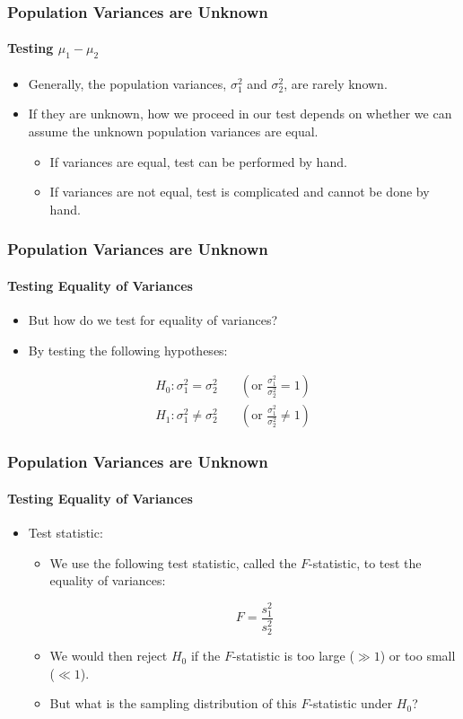 \documentclass[12pt]{beamer}
\begin{document}
\begin{frame}
	\frametitle{Population Variances are Unknown}
	\framesubtitle{Testing $\mu_1 - \mu_2$}
	
	\begin{itemize}[label={\color{blue}$\blacktriangleright$}]
		\item Generally, the population variances, $\sigma_1^2$ and $\sigma_2^2$, are rarely known.
		\item If they are unknown, how we proceed in our test depends on whether we can assume the unknown population variances are equal.
		\begin{itemize}[label={\color{blue}$\blacktriangleright$}]
			\item If variances are equal, test can be performed by hand.
			\item If variances are not equal, test is complicated and cannot be done by hand.
		\end{itemize}
	\end{itemize}
	
\end{frame}
\begin{frame}
	\frametitle{Population Variances are Unknown}
	\framesubtitle{Testing Equality of Variances}
	
	\begin{itemize}[label={\color{blue}$\blacktriangleright$}]
		\item But how do we test for equality of variances?
		\item By testing the following hypotheses:
	\end{itemize}
	

	\begin{align*}
		H_0 : \sigma_1^2 = \sigma_2^2 \quad &\left(\text{or } \frac{\sigma_1^2}{\sigma_2^2} = 1\right) \\[0.5cm]
		H_1 : \sigma_1^2 \neq \sigma_2^2 \quad &\left(\text{or } \frac{\sigma_1^2}{\sigma_2^2} \neq 1\right)
	\end{align*}
	
\end{frame}
\begin{frame}
	\frametitle{Population Variances are Unknown}
	\framesubtitle{Testing Equality of Variances}
	
	\begin{itemize}[label={\color{blue}$\blacktriangleright$}]
		\item Test statistic:
		\begin{itemize}[label={\color{blue}$\blacktriangleright$}]
			\item We use the following test statistic, called the $F$-statistic, to test the equality of variances:
			
			\[
			F = \frac{s_1^2}{s_2^2}
			\]
			
			\item We would then reject $H_0$ if the $F$-statistic is too large ($\gg 1$) or too small ($\ll 1$).
			\item But what is the sampling distribution of this $F$-statistic under $H_0$?
		\end{itemize}
	\end{itemize}
	
\end{frame}
\end{document}
